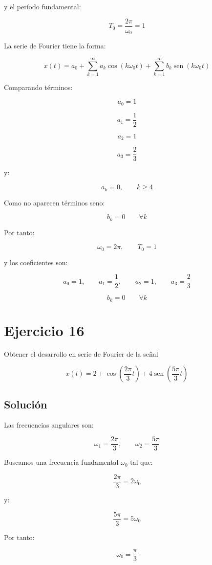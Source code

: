 \documentclass[fleqn]{article}
\DeclareMathOperator{\sen}{sen}
\begin{document}
	y el período fundamental:

	\[
	T_0
	=
	\frac{2\pi}{\omega_0}
	=
	1
	\]

	La serie de Fourier tiene la forma:

	\[
	x(t)
	=
	a_0
	+
	\sum_{k=1}^{\infty}
	a_k\cos(k\omega_0t)
	+
	\sum_{k=1}^{\infty}
	b_k\sen(k\omega_0t)
	\]

	Comparando términos:

	\[
	a_0=1
	\]

	\[
	a_1=\frac{1}{2}
	\]

	\[
	a_2=1
	\]

	\[
	a_3=\frac{2}{3}
	\]

	y:

	\[
	a_k=0,
	\qquad
	k\geq4
	\]

	Como no aparecen términos seno:

	\[
	b_k=0
	\qquad
	\forall k
	\]

	Por tanto:

	\[
	\boxed{
	\omega_0=2\pi,
	\qquad
	T_0=1
	}
	\]

	y los coeficientes son:

	\[
	\boxed{
	a_0=1,\qquad
	a_1=\frac{1}{2},\qquad
	a_2=1,\qquad
	a_3=\frac{2}{3}
	}
	\]

	\[
	\boxed{
	b_k=0
	\qquad
	\forall k
	}
	\]

\section{Ejercicio 16}
	Obtener el desarrollo en serie de Fourier de la señal

	\[
	x(t)
	=
	2+\cos\left(\frac{2\pi}{3}t\right)
	+4\sen\left(\frac{5\pi}{3}t\right)
	\]

	\subsection{Solución}

	Las frecuencias angulares son:

	\[
	\omega_1=\frac{2\pi}{3},
	\qquad
	\omega_2=\frac{5\pi}{3}
	\]

	Buscamos una frecuencia fundamental $\omega_0$ tal que:

	\[
	\frac{2\pi}{3}=2\omega_0
	\]

	y:

	\[
	\frac{5\pi}{3}=5\omega_0
	\]

	Por tanto:

	\[
	\omega_0=\frac{\pi}{3}
	\]
\end{document}

